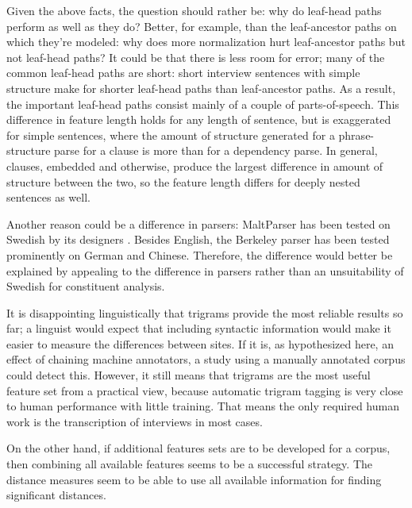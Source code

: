 
Given the above facts, the question should rather be: why do leaf-head
paths perform as well as they do? Better, for example, than the
leaf-ancestor paths on which they're modeled: why does more
normalization hurt leaf-ancestor paths but not leaf-head paths?  It
could be that there is less room for error; many of the common
leaf-head paths are short: short interview sentences with simple
structure make for shorter leaf-head paths than leaf-ancestor
paths. As a result, the important leaf-head paths consist mainly of a
couple of parts-of-speech. This difference in feature length holds for
any length of sentence, but is exaggerated for simple sentences, where
the amount of structure generated for a phrase-structure parse for a
clause is more than for a dependency parse. In general, clauses,
embedded and otherwise, produce the largest difference in amount of
structure between the two, so the feature length differs for deeply
nested sentences as well.

Another reason could be a difference in parsers: MaltParser has been
tested on Swedish by its designers \cite{nivre06b}. Besides English, the Berkeley
parser has been tested prominently on German and Chinese. Therefore,
the difference would better be explained by appealing to the
difference in parsers rather than an unsuitability of Swedish for
constituent analysis.

It is disappointing linguistically that trigrams provide the most
reliable results so far; a linguist would expect that including
syntactic information would make it easier to measure the differences
between sites. If it is, as hypothesized here, an effect of chaining
machine annotators, a study using a manually annotated corpus could
detect this. However, it still means that trigrams are the most useful
feature set from a practical view, because automatic trigram tagging
is very close to human performance with little training. That means
the only required human work is the transcription of interviews in
most cases.

On the other hand, if additional features sets are to be developed for
a corpus, then combining all available features seems to be a
successful strategy. The distance measures seem to be able to use all
available information for finding significant distances.


